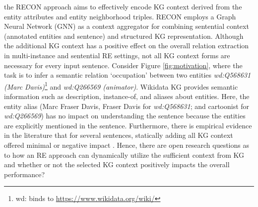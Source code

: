 \documentclass[11pt,a4paper]{article}
\begin{document}
the RECON approach \cite{bastos2020recon} aims to effectively encode KG context derived from the entity attributes and entity neighborhood triples. RECON employs a Graph Neural Network (GNN) as a context aggregator for combining sentential context (annotated entities and sentence) and structured KG representation. Although the additional KG context has a positive effect on the overall relation extraction in multi-instance and sentential RE settings, not all KG context forms are necessary for every input sentence. 
Consider Figure \ref{fig:motivation}, where the task is to infer a semantic relation ‘occupation' between two entities \textit{wd:Q568631 (Marc Davis)}\footnote{wd: binds to \url{https://www.wikidata.org/wiki/}} and \textit{wd:Q266569 (animator)}. Wikidata \cite{DBLP:conf/www/Vrandecic12} KG provides semantic information such as description, instance-of, and aliases about entities.
Here, the entity alias (Marc Fraser Davis, Fraser Davis for \textit{wd:Q568631}; and cartoonist for \textit{wd:Q266569}) has no impact on understanding the sentence because the entities are explicitly mentioned in the sentence. Furthermore, there is empirical evidence in the literature that for several sentences, statically adding all KG context offered minimal or negative impact \cite{bastos2020recon}.
Hence, there are open research questions as to how an RE approach can dynamically utilize the sufficient context from KG and whether or not the selected KG context positively impacts the overall performance?
\end{document}
